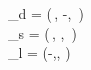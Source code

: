 _d = \left(\cos\alpha\,\cos\beta,\;\; -\sin\beta,\;\; \sin\alpha\,\cos\beta\right) \\

_s = \left(\cos\alpha\,\sin\beta,\;\; \cos\beta,\;\; \sin\alpha\,\sin\beta\right) \\

_l = \left(-\sin\alpha,\;,\;\; \cos\alpha\right)
